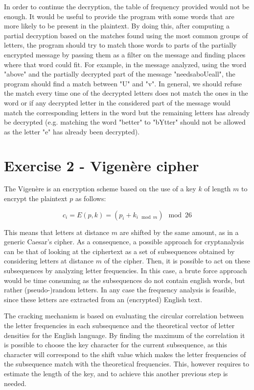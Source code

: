 \documentclass[12pt]{article}
\begin{document}
In order to continue the decryption, the table of frequency provided would not be enough. It would be useful to provide the program with some words that are more likely to be present in the plaintext. By doing this, after computing a partial decryption based on the matches found using the most common groups of letters, the program should try to match those words to parts of the partially encrypted message by passing them as a filter on the message and finding places where that word could fit. For example, in the message analyzed, using the word "above" and the partially decrypted part of the message "needsaboUeall", the program should find a match between "U" and "v". In general, we should refuse the match every time one of the decrypted letters does not match the ones in the word or if any decrypted letter in the considered part of the message would match the corresponding letters in the word but the remaining letters has already be decrypted (e.g. matching the word "better" to "bYtter" should not be allowed as the letter "e" has already been decrypted).


\section{Exercise 2 - Vigenère cipher}

The Vigenère is an encryption scheme based on the use of a key $k$ of length $m$ to encrypt the plaintext $p$ as follows:

\begin{equation}
  c_i = E(p,k) = (p_i + k_{i\mod{m}})\mod{26}
\end{equation}

This means that letters at distance $m$ are shifted by the same amount, as in a generic Caesar's cipher.
As a consequence, a possible approach for cryptanalysis can be that of looking at the ciphertext as a set of subsequences obtained by considering letters at distance $m$ of the cipher. 
Then, it is possible to act on these subsequences by analyzing letter frequencies. In this case, a brute force approach would be time consuming as the subsequences do not contain english words, but rather (pseudo-)random letters. 
In any case the frequency analysis is feasible, since these letters are extracted from an (encrypted) English text.

The cracking mechanism is based on evaluating the circular correlation between the letter frequencies in each subsequence and the theoretical vector of letter densities for the English language. 
By finding the maximum of the correlation it is possible to choose the key character for the current subsequence, as this character will correspond to the shift value which makes the letter frequencies of the subsequence match with the theoretical frequencies.
This, however requires to estimate the length of the key, and to achieve this another previous step is needed.
\end{document}
